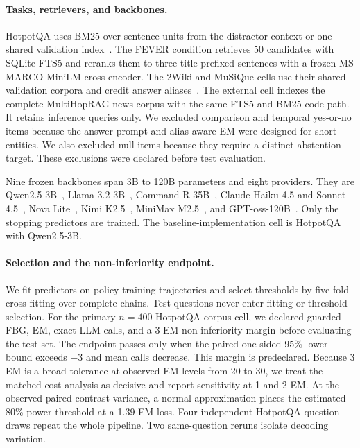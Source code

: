 \paragraph{Tasks, retrievers, and backbones.}
HotpotQA uses BM25 over sentence units from the distractor context or one
shared validation index~\cite{yang2018hotpotqa,robertson2009bm25}. The FEVER
condition retrieves 50 candidates with SQLite FTS5 and reranks them to three
title-prefixed sentences with a frozen MS MARCO MiniLM cross-encoder. The
2Wiki and MuSiQue cells use their shared validation corpora and credit answer
aliases~\cite{ho2020constructing,trivedi2022musique}. The external cell
indexes the complete MultiHopRAG news corpus with the same FTS5 and BM25 code
path. It retains inference queries only. We excluded comparison and temporal
yes-or-no items because the answer prompt and alias-aware EM were designed for
short entities. We also excluded null items because they require a distinct
abstention target. These exclusions were declared before test evaluation.

Nine frozen backbones span 3B to 120B parameters and eight providers. They are
Qwen2.5-3B~\cite{qwen25}, Llama-3.2-3B~\cite{meta2024llama32},
Command-R-35B~\cite{cohere2024commandr}, Claude Haiku 4.5 and Sonnet
4.5~\cite{anthropic2025sonnet45,anthropic2025haiku45}, Nova Lite~\cite{amazon2024nova}, Kimi
K2.5~\cite{kimi2026k25}, MiniMax M2.5~\cite{minimax2026m25}, and
GPT-oss-120B~\cite{openai2025gptoss}. Only the stopping predictors are trained.
The baseline-implementation cell is HotpotQA with Qwen2.5-3B.

\paragraph{Selection and the non-inferiority endpoint.}
We fit predictors on policy-training trajectories and select thresholds by
five-fold cross-fitting over complete chains. Test questions never enter
fitting or threshold selection. For the primary $n=400$ HotpotQA corpus cell,
we declared guarded FBG, EM, exact LLM calls, and a 3-EM non-inferiority margin
before evaluating the test set. The endpoint passes only when the paired
one-sided 95\% lower bound exceeds $-3$ and mean calls decrease. This margin is
predeclared. Because 3 EM is a broad tolerance at observed EM levels from 20
to 30, we treat the matched-cost analysis as decisive and report sensitivity
at 1 and 2 EM. At the observed paired contrast variance, a normal
approximation places the estimated 80\% power threshold at a 1.39-EM loss.
Four independent HotpotQA question draws repeat the whole pipeline. Two
same-question reruns isolate decoding variation.

